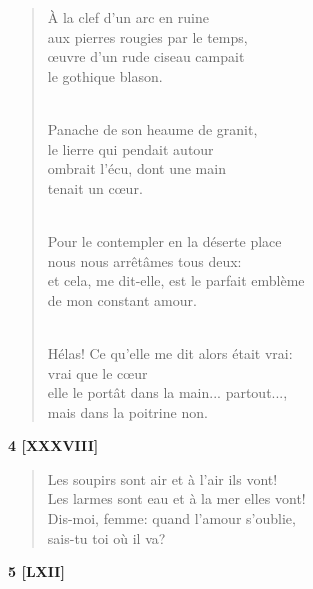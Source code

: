 \documentclass[a4paper,12pt]{book}
\begin{document}
\begin{verse}
À la clef d'un arc en ruine \\
aux pierres rougies par le temps, \\
{\oe}uvre d'un rude ciseau campait \\
le gothique blason. \\ \

Panache de son heaume de granit, \\
le lierre qui pendait autour \\
ombrait l'écu, dont une main \\
tenait un c{\oe}ur. \\ \


Pour le contempler en la déserte place \\
nous nous arrêtâmes tous deux: \\
et cela, me dit-elle, est le parfait emblème \\
de mon constant amour. \\ \

Hélas! Ce qu'elle me dit alors était vrai: \\
vrai que le c{\oe}ur \\
elle le portât dans la main... partout..., \\
mais dans la poitrine non. \\
\end{verse}

\bigskip

\begin{center} \textbf{4 [XXXVIII]}  \end{center}

\begin{verse}
Les soupirs sont air et à l'air ils vont! \\
Les larmes sont eau et à la mer elles vont! \\
Dis-moi, femme: quand l'amour s'oublie, \\
sais-tu toi où il va? \\
\end{verse}

\bigskip

\begin{center} {\bf 5 [LXII]} \end{center}

\smallskip
\end{document}
